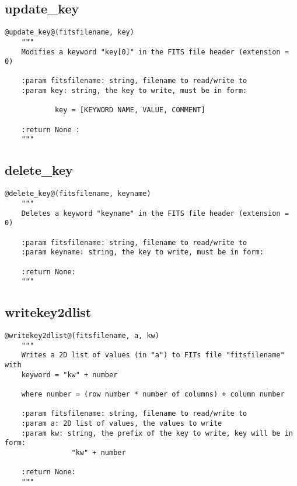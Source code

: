 \subsection{update\_key}
\begin{lstlisting}[style=pythonstyle]
@update_key@(fitsfilename, key)
    """
    Modifies a keyword "key[0]" in the FITS file header (extension = 0)
    
    :param fitsfilename: string, filename to read/write to
    :param key: string, the key to write, must be in form:

            key = [KEYWORD NAME, VALUE, COMMENT]

    :return None :
    """
\end{lstlisting}

\subsection{delete\_key}
\begin{lstlisting}[style=pythonstyle]
@delete_key@(fitsfilename, keyname)
    """
    Deletes a keyword "keyname" in the FITS file header (extension = 0)

    :param fitsfilename: string, filename to read/write to
    :param keyname: string, the key to write, must be in form:

    :return None:
    """
\end{lstlisting}

\subsection{writekey2dlist}
\begin{lstlisting}[style=pythonstyle]
@writekey2dlist@(fitsfilename, a, kw)
    """
    Writes a 2D list of values (in "a") to FITs file "fitsfilename" with
    keyword = "kw" + number

    where number = (row number * number of columns) + column number

    :param fitsfilename: string, filename to read/write to
    :param a: 2D list of values, the values to write
    :param kw: string, the prefix of the key to write, key will be in form:
                "kw" + number

    :return None:
    """
\end{lstlisting}

